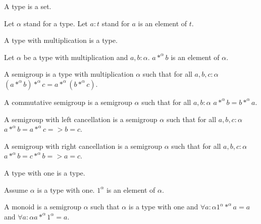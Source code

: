 \documentclass{article}
\begin{document}
\begin{forthel}

\begin{signature}
A type is a set.
\end{signature}

Let $\alpha$ stand for a type.
Let $a : t$ stand for $a$ is an element of $t$.

\begin{signature}
A type with multiplication is a type.
\end{signature}

\begin{signature}
Let $\alpha$ be a type with multiplication and $a,b : \alpha$.
$a *^{\alpha} b$ is an element of $\alpha$.
\end{signature}

\begin{definition}
A semigroup is a type with multiplication $\alpha$
such that for all $a,b,c : \alpha$
$(a *^{\alpha} b) *^{\alpha} c = a *^{\alpha} (b *^{\alpha} c)$.
\end{definition}

\begin{definition}
A commutative semigroup is a semigroup $\alpha$
such that for all $a,b : \alpha$
$a *^{\alpha} b = b *^{\alpha} a$.
\end{definition}

\begin{definition}
A semigroup with left cancellation is a semigroup
$\alpha$ such that for all $a,b,c : \alpha$
$a *^{\alpha} b = a *^{\alpha} c => b = c$.
\end{definition}

\begin{definition}
A semigroup with right cancellation is a semigroup
$\alpha$ such that for all $a,b,c : \alpha$
$a *^{\alpha} b = c *^{\alpha} b => a = c$.
\end{definition}

\begin{signature}
A type with one is a type.
\end{signature}

\begin{signature}
Assume $\alpha$ is a type with one. $1^{\alpha}$ is an
element of $\alpha$.
\end{signature}

\begin{definition}
A monoid is a semigroup $\alpha$ such that $\alpha$ is a type
with one and
$\forall a : \alpha 1^{\alpha} *^{\alpha} a = a$ and
$\forall a : \alpha a *^{\alpha} 1^{\alpha} = a$.
\end{definition}


\end{forthel}
\end{document}
